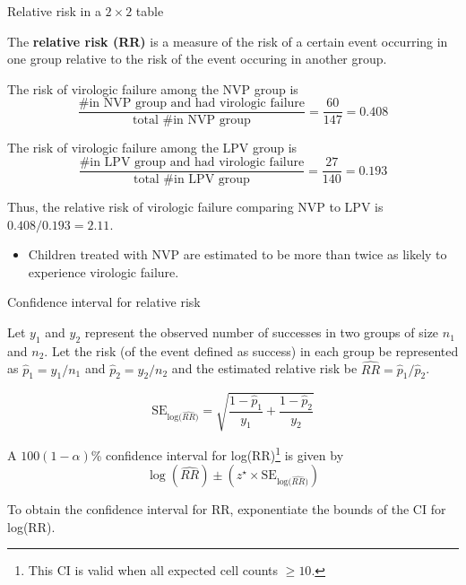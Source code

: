 \documentclass[
  ignorenonframetext,
  aspectratio=169]{beamer}
\providecommand{\tightlist}{%
  \setlength{\itemsep}{0pt}\setlength{\parskip}{0pt}}
\begin{document}
\begin{frame}{Relative risk in a \(2 \times 2\) table}
\protect\hypertarget{relative-risk-in-a-2-times-2-table}{}
\small

The \textbf{relative risk (RR)} is a measure of the risk of a certain
event occurring in one group relative to the risk of the event occuring
in another group.

The risk of virologic failure among the NVP group is
\[\dfrac{\text{\# in NVP group and had virologic failure}}{\text{total \# in NVP group}} = \dfrac{60}{147} = 0.408 \]

The risk of virologic failure among the LPV group is
\[\dfrac{\text{\# in LPV group and had virologic failure}}{\text{total \# in LPV group}} = \dfrac{27}{140} = 0.193\]

Thus, the relative risk of virologic failure comparing NVP to LPV is
\(0.408/0.193 = 2.11\).

\begin{itemize}
\tightlist
\item
  Children treated with NVP are estimated to be more than twice as
  likely to experience virologic failure.
\end{itemize}
\end{frame}

\begin{frame}{Confidence interval for relative risk}
\protect\hypertarget{confidence-interval-for-relative-risk}{}
\small

Let \(y_1\) and \(y_2\) represent the observed number of successes in
two groups of size \(n_1\) and \(n_2\). Let the risk (of the event
defined as success) in each group be represented as
\(\hat{p}_1 = y_1/n_1\) and \(\hat{p}_2 = y_2/n_2\) and the estimated
relative risk be \(\widehat{RR} = \hat{p}_1/\hat{p}_2\).

\[\text{SE}_{\text{log($\widehat{RR}$)}} = \sqrt{\dfrac{1 - \hat{p}_1}{y_1} + \dfrac{1 - \hat{p}_2}{y_2}} \]

A \(100(1-\alpha)\)\% confidence interval for
log(RR)\footnote{This CI is valid when all expected cell counts $\geq 10$.}
is given by
\[\log(\widehat{RR}) \pm \left( z^\star \times  \text{SE}_{\text{log($\widehat{RR}$)}} \right) \]

To obtain the confidence interval for RR, exponentiate the bounds of the
CI for log(RR).
\end{frame}
\end{document}
